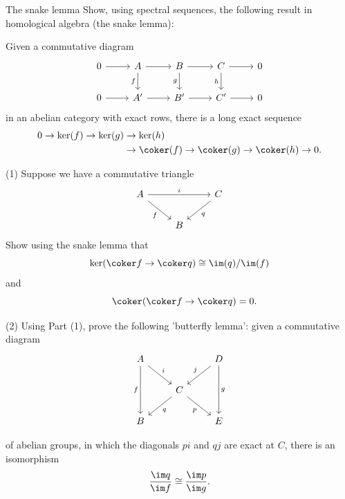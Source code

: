 \documentclass[ma3408.tex]{subfiles}
\begin{document}
\begin{exercise}{The snake lemma}{}
Show, using spectral sequences, the following result in homological algebra (the snake lemma):

Given a commutative diagram
\[
\begin{tikzcd}
0 \arrow[r] & A \arrow[d, "f"'] \arrow[r] & B \arrow[d, "g"'] \arrow[r] & C \arrow[d, "h"'] \arrow[r] & 0 \\
0 \arrow[r] & A' \arrow[r]                & B' \arrow[r]                & C' \arrow[r]                & 0
\end{tikzcd}\]
in an abelian category with exact rows, there is a long exact sequence 
\[
\begin{split}
0 \to \ker(f) \to \ker(g) &\to \ker(h) \\&\to \coker(f) \to \coker(g) \to \coker(h) \to 0. 
\end{split}
\]
\end{exercise}
\begin{exercise}{}{}
(1) Suppose we have a commutative triangle
\[\begin{tikzcd}
	A && C \\
	& B
	\arrow["i", from=1-1, to=1-3]
	\arrow["f"', from=1-1, to=2-2]
	\arrow["q", from=1-3, to=2-2]
\end{tikzcd}\]
Show using the snake lemma that 
\[
\ker(\coker f \to \coker q) \cong \im(q)/\im(f) 
\]
and
\[
\quad \coker(\coker f \to \coker q) = 0.
\]

(2) Using Part (1), prove the following 'butterfly lemma': given a commutative diagram
\[\begin{tikzcd}
	A && D \\
	& C \\
	B && E
	\arrow["f"', from=1-1, to=3-1]
	\arrow["i", from=1-1, to=2-2]
	\arrow["q", from=2-2, to=3-1]
	\arrow["j"', from=1-3, to=2-2]
	\arrow["g", from=1-3, to=3-3]
	\arrow["p"', from=2-2, to=3-3]
\end{tikzcd}\]

of abelian groups, in which the diagonals $pi$ and $qj$ are exact at $C$, there is an isomorphism
\[
\frac{\im q}{\im f} \cong \frac{\im p}{\im g}. 
\]
\end{exercise}
\end{document}
